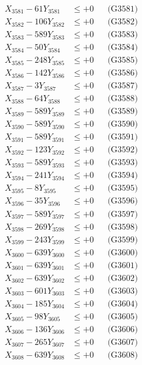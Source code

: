 \documentclass[a4paper,10pt]{article}
\begin{document}
{\begin{align}
\allowbreak
X_{3581} - 61Y_{3581} &\leq +0 && \text{(G3581)} \\
X_{3582} - 106Y_{3582} &\leq +0 && \text{(G3582)} \\
X_{3583} - 589Y_{3583} &\leq +0 && \text{(G3583)} \\
X_{3584} - 50Y_{3584} &\leq +0 && \text{(G3584)} \\
X_{3585} - 248Y_{3585} &\leq +0 && \text{(G3585)} \\
X_{3586} - 142Y_{3586} &\leq +0 && \text{(G3586)} \\
X_{3587} - 3Y_{3587} &\leq +0 && \text{(G3587)} \\
X_{3588} - 64Y_{3588} &\leq +0 && \text{(G3588)} \\
X_{3589} - 589Y_{3589} &\leq +0 && \text{(G3589)} \\
X_{3590} - 589Y_{3590} &\leq +0 && \text{(G3590)} \\
\allowbreak
X_{3591} - 589Y_{3591} &\leq +0 && \text{(G3591)} \\
X_{3592} - 123Y_{3592} &\leq +0 && \text{(G3592)} \\
X_{3593} - 589Y_{3593} &\leq +0 && \text{(G3593)} \\
X_{3594} - 241Y_{3594} &\leq +0 && \text{(G3594)} \\
X_{3595} - 8Y_{3595} &\leq +0 && \text{(G3595)} \\
X_{3596} - 35Y_{3596} &\leq +0 && \text{(G3596)} \\
X_{3597} - 589Y_{3597} &\leq +0 && \text{(G3597)} \\
X_{3598} - 269Y_{3598} &\leq +0 && \text{(G3598)} \\
X_{3599} - 243Y_{3599} &\leq +0 && \text{(G3599)} \\
X_{3600} - 639Y_{3600} &\leq +0 && \text{(G3600)} \\
\allowbreak
X_{3601} - 639Y_{3601} &\leq +0 && \text{(G3601)} \\
X_{3602} - 639Y_{3602} &\leq +0 && \text{(G3602)} \\
X_{3603} - 601Y_{3603} &\leq +0 && \text{(G3603)} \\
X_{3604} - 185Y_{3604} &\leq +0 && \text{(G3604)} \\
X_{3605} - 98Y_{3605} &\leq +0 && \text{(G3605)} \\
X_{3606} - 136Y_{3606} &\leq +0 && \text{(G3606)} \\
X_{3607} - 265Y_{3607} &\leq +0 && \text{(G3607)} \\
X_{3608} - 639Y_{3608} &\leq +0 && \text{(G3608)} \\

\end{align}}
\end{document}
